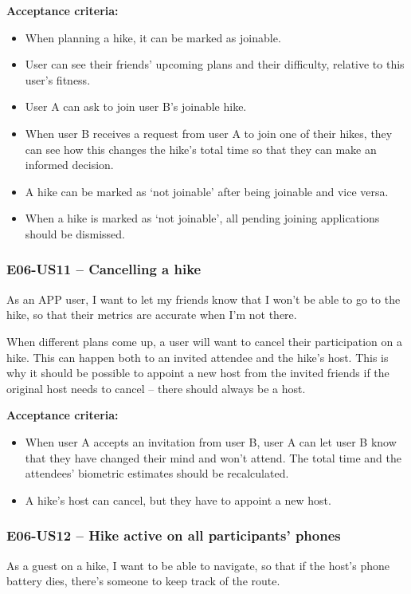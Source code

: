\textbf{Acceptance criteria:}
\begin{itemize}
    \item When planning a hike, it can be marked as joinable.
    \item User can see their friends' upcoming plans and their difficulty, relative to this user's fitness.
    \item User A can ask to join user B's joinable hike.
    \item When user B receives a request from user A to join one of their hikes, they can see how this changes the hike's total time so that they can make an informed decision.
    \item A hike can be marked as `not joinable' after being joinable and vice versa.
    \item When a hike is marked as `not joinable', all pending joining applications should be dismissed.
\end{itemize}

\subsubsection*{E06-US11 -- Cancelling a hike}
As an APP user, I want to let my friends know that I won't be able to go to the hike, so that their metrics are accurate when I'm not there.

When different plans come up, a user will want to cancel their participation on a hike.
This can happen both to an invited attendee and the hike's host.
This is why it should be possible to appoint a new host from the invited friends if the original host needs to cancel -- there should always be a host.

\textbf{Acceptance criteria:}
\begin{itemize}
    \item When user A accepts an invitation from user B, user A can let user B know that they have changed their mind and won't attend. The total time and the attendees' biometric estimates should be recalculated.
    \item A hike's host can cancel, but they have to appoint a new host.
\end{itemize}

\subsubsection*{E06-US12 -- Hike active on all participants' phones}
As a guest on a hike, I want to be able to navigate, so that if the host's phone battery dies, there's someone to keep track of the route.

